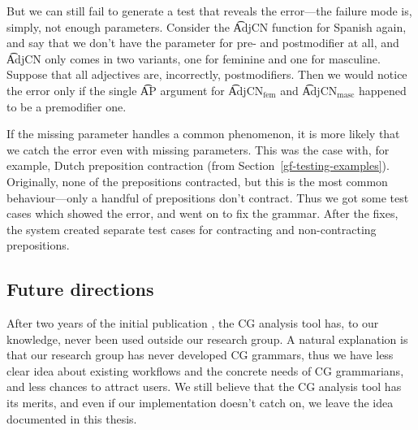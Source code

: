 But we can still fail to generate a test that reveals the error---the
failure mode is, simply, not enough parameters.  Consider the
\t{AdjCN} function for Spanish again, and say that we don’t have the
parameter for pre- and postmodifier at all, and \t{AdjCN} only comes
in two variants, one for feminine and one for masculine. Suppose that
all adjectives are, incorrectly, postmodifiers. Then we would notice
the error only if the single \t{AP} argument for \t{AdjCN$_{\text{fem}}$} 
and \t{AdjCN$_{\text{masc}}$} happened to be a premodifier one.

If the missing parameter handles a common phenomenon, it is more
likely that we catch the error even with missing parameters. This was
the case with, for example, Dutch preposition contraction (from
Section~\ref{gf-testing-examples}). Originally, none of the
prepositions contracted, but this is the most common behaviour---only a
handful of prepositions don’t contract. Thus we got some test cases
which showed the error, and went on to fix the grammar. After the
fixes, the system created separate test cases for contracting and
non-contracting prepositions.

\subsection{Future directions}

After two years of the initial publication
\cite{listenmaa_claessen2016}, the CG analysis tool has, to our
knowledge, never been used outside our research group. A natural
explanation is that our research group has never developed CG
grammars, thus we have less clear idea about existing workflows and
the concrete needs of CG grammarians, and less chances to attract
users. %
We still believe that the CG analysis tool has its merits, and
even if our implementation doesn't catch on, we leave the idea
documented in this thesis.





